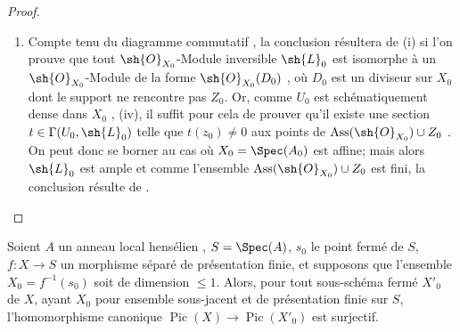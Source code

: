 \begin{proof}
\begin{enumerate}[label=(\roman*)]
En vertu du choix de $U^{(x)}$, on peut définir un diviseur $D'^{(x)}$ sur $U^{(x)}$ par $D'^{(x)}=\operatorname{div}(g^{(x)})$;
d'ailleurs on a vu ci-dessus que $x$ est nécessairement isolé dans $V^{(x)}\cap X_0$, donc en remplaçant encore $U^{(x)}$ par un voisinage ouvert plus petit de $x$, on peut supposer que $V^{(x)}\cap X_0$ est réduit au point $x$.
Mais il existe alors, en vertu de la condition 2\textsuperscript{o}, une partie $W^{(x)}$ de $V^{(x)}$, fermée dans $X$ et ouverte dans $V^{(x)}$, telle que $W^{(x)}\cap X_0=\{x\}$.
Remplaçant encore $U^{(x)}$ par un voisinage ouvert plus petit de $x$, on peut donc supposer
que $W^{(x)}=V^{(x)}$, autrement dit que $V^{(x)}$ est fermé dans $X$.
On peut alors définir un diviseur $D^{(x)}$ sur $X$ par la condition que $D^{(x)}|U^{(x)}=D'^{(x)}$, et $D^{(x)}|(X-V^{(x)})=0$, ce qui a un sens puisque dans $U^{(x)}\cap(X-V^{(x)})$ la restriction de $g^{(x)}$ est une section inversible, donc les restrictions à cet ouvert des deux diviseurs considérés sur $U^{(x)}$ et $X-V^{(x)}$ sont égales.
Il suffit alors, pour répondre à la question, de prendre $D=\sum_{x\in T}D^{(x)}$, ce qui a un sens puisque $T$ est fini.

  \item Compte tenu du diagramme commutatif , la conclusion résultera de (i) si l'on prouve que tout $\sh{O}_{X_0}$-Module inversible $\sh{L}_0$ est isomorphe à un $\sh{O}_{X_0}$-Module de la forme $\sh{O}_{X_0}(D_0)$ , où $D_0$ est un diviseur sur $X_0$ dont le support ne rencontre pas $Z_0$.
Or, comme $U_0$ est schématiquement dense dans $X_0$ , (iv), il suffit pour cela de prouver qu'il existe une section $t\in\Gamma(U_0,\sh{L}_0)$ telle que $t(z_0)\neq0$ aux points de $\operatorname{Ass}(\sh{O}_{X_0})\cup Z_0$ .
On peut donc se borner au cas où $X_0=\Spec(A_0)$ est affine;
mais alors $\sh{L}_0$ est ample  et comme l'ensemble $\operatorname{Ass}(\sh{O}_{X_0})\cup Z_0$ est fini, la conclusion résulte de .
\end{enumerate}
\end{proof}

\begin{corollary}[21.9.12]
\label{IV.21.9.12}
Soient $A$ un anneau local hensélien , $S=\Spec(A)$, $s_0$ le point fermé de $S$, $f:X\to S$ un morphisme séparé de présentation finie, et supposons que l'ensemble $X_0=f^{-1}(s_0)$ soit de dimension $\leq1$.
Alors, pour tout sous-schéma fermé $X'_0$ de $X$, ayant $X_0$ pour ensemble sous-jacent et de présentation finie sur $S$, l'homomorphisme canonique  $\operatorname{Pic}(X)\to\operatorname{Pic}(X'_0)$ est surjectif.
\end{corollary}

